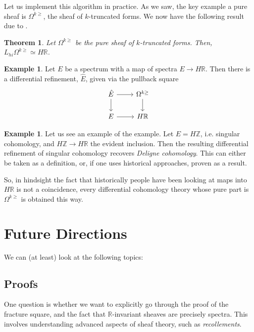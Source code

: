 \documentclass[10pt]{amsart}
\newcommand{\bR}{\mathbb{R}}
\newcommand{\bZ}{\mathbb{Z}}
\newtheorem{theorem}[equation]{Theorem}
\theoremstyle{definition}
\newtheorem{example}[equation]{Example}
\theoremstyle{remark}
\numberwithin{equation}{section}
\begin{document}
Let us implement this algorithm in practice. As we saw, the key example a pure sheaf is $\Omega^{k \geq}$, the sheaf of $k$-truncated forms. We now have the following result due to \cite{bunkenikolausvoelkl2016diffcoh}.

\begin{theorem}
  Let $\Omega^{k \geq}$ be the pure sheaf of $k$-truncated forms. Then, $L_{hi}\Omega^{k \geq} \simeq H\bR$. 
\end{theorem}

\begin{example}
 Let $E$ be a spectrum with a map of spectra $E \to H\bR$. Then there is a differential refinement, $\hat{E}$, given via the pullback square 
 \[ 
 \begin{tikzcd}
 \hat{E} \arrow{r} \arrow{d} & \Omega^{k \geq}  \arrow{d} \\
 E \arrow{r} & H\bR
 \end{tikzcd}
 \]
\end{example}

\begin{example}
 Let us see an example of the example. Let $E = H\bZ$, i.e. singular cohomology, and $H\bZ \to H\bR$ the evident inclusion. Then the resulting differential refinement of singular cohomology recovers \emph{Deligne cohomology}. This can either be taken as a definition, or, if one uses historical approaches, proven as a result.
\end{example}

So, in hindsight the fact that historically people have been looking at maps into $H\bR$ is not a coincidence, every differential cohomology theory whose pure part is $\Omega^{k \geq}$ is obtained this way.

\section{Future Directions}
We can (at least) look at the following topics:

\subsection{Proofs}
One question is whether we want to explicitly go through the proof of the fracture square, and the fact that $\bR$-invariant sheaves are precisely spectra. This involves understanding advanced aspects of sheaf theory, such as \emph{recollements}.
\end{document}
